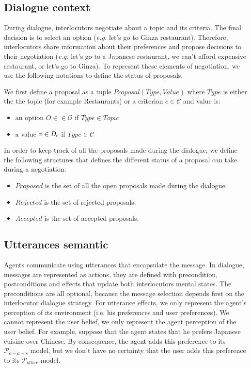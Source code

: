 \documentclass{llncs}
\begin{document}
 
\subsection{Dialogue context}
 
During dialogue, interlocutors  negotiate  about a topic and its criteria. The final decision is to select an option (\emph{e.g.} let's go to Ginza restaurant). Therefore, interlocutors share information about their preferences and propose decisions to their negotiation (\emph{e.g.} let's go to a Japanese restaurant, we can't afford expensive restaurant, or let's go to Ginza). To represent these elements of negotiation, we use the following notations to define the status of proposals.

We first define a proposal as a tuple $Proposal(Type, Value)$ where  $Type$ is either the the topic (for example Restaurants) or a criterion $c \in \mathcal{C}$ and value is:
\begin{itemize}
	\item an option $O \in \in \mathcal{O}$ if $Type \in Topic$ 
	\item a value $v \in \emph{D}_c$ if $Type \in \mathcal{C}$
\end{itemize}
    

In order to keep track of all the proposals made during the dialogue, we define the following structures that defines the different status of a proposal can take during a negotiation:
 \begin{itemize}
	 	\item $Proposed$ is the set of all the open proposals made during the dialogue.
	 	\item $Rejected$  is the set of rejected proposals.
	 	\item $Accepted$  is the set of accepted proposals.
 \end{itemize}


\subsection{Utterances semantic}
Agents communicate using utterances that encapsulate the message. In dialogue, messages are represented as actions, they are defined with precondition, postconditions and effects that update both interlocutors mental states. The preconditions are all optional, because the message selection depends first on the interlocutor dialogue strategy. For utterance effects, we only represent the  agent's perception of its environment (i.e. his preferences and user preferences). We cannot represent the user belief, we only represent the agent perception of the user belief. For example, suppose that the agent states that he prefers Japanese cuisine over Chinese. By consequence, the agent adds this preference to its $\mathcal{P}_{o-a-s}$ model, but we don't have no certainty that the user adds this preference to its $\mathcal{P}_{other}$  model.
\end{document}
